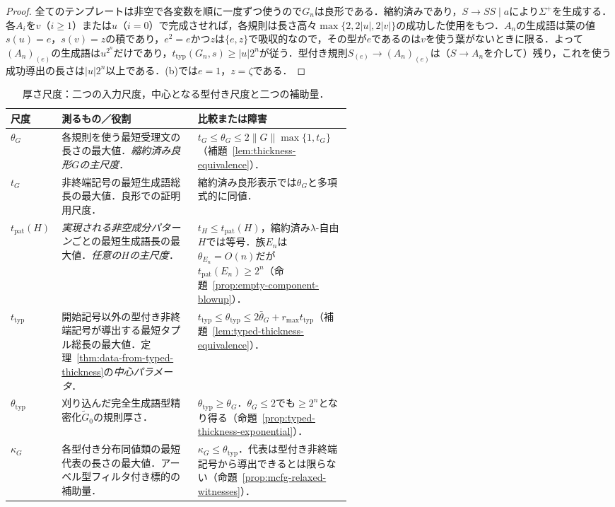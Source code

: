 \begin{proof}
全てのテンプレートは非空で各変数を順に一度ずつ使うので$G_n$は良形である．縮約済みであり，$S\to SS\mid a$により$\Sigma^+$を生成する．各$A_i$を$v$（$i\ge1$）または$u$（$i=0$）で完成させれば，各規則は長さ高々$\max\{2,2|u|,2|v|\}$の成功した使用をもつ．$A_n$の生成語は葉の値$s(u)=e$，$s(v)=z$の積であり，$e^2=e$かつ$z$は$\{e,z\}$で吸収的なので，その型が$e$であるのは$v$を使う葉がないときに限る．よって$(A_n)_{(e)}$の生成語は$u^{2^n}$だけであり，$t_{\mathrm{typ}}(G_n,s)\ge|u|2^n$が従う．型付き規則$S_{(e)}\to(A_n)_{(e)}$は（$S\to A_n$を介して）残り，これを使う成功導出の長さは$|u|2^n$以上である．(b)では$e=1$，$z=\zeta$である．
\end{proof}

\begin{table}[htbp]
\caption{厚さ尺度：二つの入力尺度，中心となる型付き尺度と二つの補助量．}
\label{tab:thickness-scales}
\centering
\footnotesize
\setlength{\tabcolsep}{3.5pt}
\renewcommand{\arraystretch}{1.18}
\begin{tabularx}{\linewidth}{@{}p{0.155\linewidth}p{0.405\linewidth}X@{}}
\hline
尺度 & 測るもの／役割 & 比較または障害\\
\hline
$\theta_G$ & 各規則を使う最短受理文の長さの最大値．\emph{縮約済み良形$G$の主尺度}． & $t_G\le\theta_G\le 2\|G\|\max\{1,t_G\}$（補題~\ref{lem:thickness-equivalence}）．\\
$t_G$ & 非終端記号の最短生成語総長の最大値．良形での証明用尺度． & 縮約済み良形表示では$\theta_G$と多項式的に同値．\\
$t_{\mathrm{pat}}(H)$ & \emph{実現される非空成分パターン}ごとの最短生成語長の最大値．\emph{任意の$H$の主尺度}． & $t_H\le t_{\mathrm{pat}}(H)$，縮約済み$\lambda$-自由$H$では等号．族$E_n$は$\theta_{E_n}=O(n)$だが$t_{\mathrm{pat}}(E_n)\ge2^n$（命題~\ref{prop:empty-component-blowup}）．\\
$t_{\mathrm{typ}}$ & 開始記号以外の型付き非終端記号が導出する最短タプル総長の最大値．定理~\ref{thm:data-from-typed-thickness}の\emph{中心パラメータ}． & $t_{\mathrm{typ}}\le\theta_{\mathrm{typ}}\le2\bar\theta_G+r_{\max}t_{\mathrm{typ}}$（補題~\ref{lem:typed-thickness-equivalence}）．\\
$\theta_{\mathrm{typ}}$ & 刈り込んだ完全生成語型精密化$\widetilde G_0$の規則厚さ． & $\theta_{\mathrm{typ}}\ge\theta_G$．$\theta_G\le2$でも$\ge2^n$となり得る（命題~\ref{prop:typed-thickness-exponential}）．\\
$\kappa_G$ & 各型付き分布同値類の最短代表の長さの最大値．アーベル型フィルタ付き標的の補助量． & $\kappa_G\le\theta_{\mathrm{typ}}$．代表は型付き非終端記号から導出できるとは限らない（命題~\ref{prop:mcfg-relaxed-witnesses}）．\\
\hline
\end{tabularx}
\end{table}

